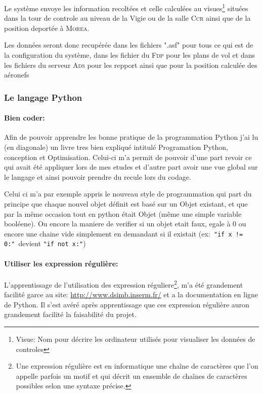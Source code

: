 Le système envoye les information recoltées et celle calculées au visues\footnote{Visue: Nom pour décrire les ordinateur utilisés pour visualiser les données de controles} situées dans la tour de controle au niveau de la Vigie ou de la salle \textsc{Ccr} ainsi que de la position deportée à \textsc{Morea}.

Les données seront donc recupérée dans les fichiers ".asf" pour tous ce qui est de la configuration du système, dans les fichier du \textsc{Fdp} pour les plans de vol et dans les fichiers du serveur \textsc{Ads} pour les repport ainsi que pour la position calculée des aéronefs


        \subsubsection{Le langage Python}
            \paragraph{Bien coder:\label{pygood}}
Afin de pouvoir apprendre les bonne pratique de la programmation Python\cite{pybook} j'ai lu (en diagonale) un livre tres bien expliqué intitulé Programation Python, conception et Optimisation. Celui-ci m'a permit de pouvoir d'une part revoir ce qui avait été appliquer lors de mes etudes et d'autre part avoir une vue global sur le langage et ainsi pouvoir prendre du recule lors du codage.

Celui ci m'a par exemple appris le nouveau style de programmation qui part du principe que chaque nouvel objet définit est basé sur un Objet existant, et que par la même occasion tout en python était Objet (même une simple variable booléene). Ou encore la maniere de verifier si un objet etait faux, egale à 0 ou encore une chaine vide simplement en demandant si il existait (ex:~\texttt{"if x != 0:"}~devient \texttt{"if not x:"})

            \paragraph{Utiliser les expression régulière:} 
L'apprentissage de l'utilisation des expression réguliere\footnote{Une expression régulière
 est en informatique une chaîne de caractères que l’on appelle parfois un motif et qui décrit un ensemble de chaînes de caractères possibles selon une syntaxe précise.}, m'a été grandement facilité garce au site: \url{http://www.dsimb.inserm.fr/}\cite{re} et a la documentation en ligne de Python\cite{pydoc}. Il s'est avéré après apprentissage que ces expression régulière auron grandement facilité la faisabilité du projet.

